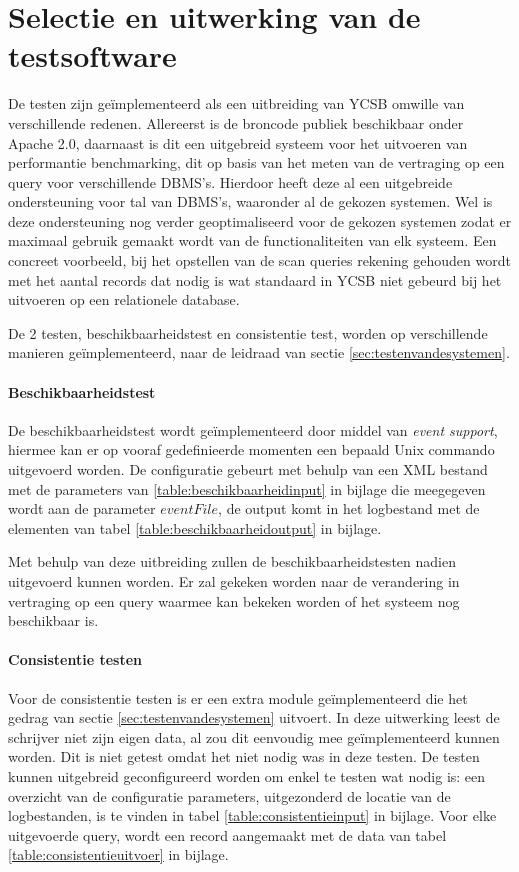 \section{Selectie en uitwerking van de testsoftware}
De testen zijn geïmplementeerd als een uitbreiding van YCSB\cite{cooper2010benchmarking} omwille van verschillende redenen. Allereerst is de broncode publiek beschikbaar onder Apache 2.0, daarnaast is dit een uitgebreid systeem voor het uitvoeren van performantie benchmarking, dit op basis van het meten van de vertraging op een query voor verschillende DBMS's. Hierdoor heeft deze al een uitgebreide ondersteuning voor tal van DBMS's, waaronder al de gekozen systemen. Wel is deze ondersteuning nog verder geoptimaliseerd voor de gekozen systemen zodat er maximaal gebruik gemaakt wordt van de functionaliteiten van elk systeem. Een concreet voorbeeld, bij het opstellen van de scan queries rekening gehouden wordt met het aantal records dat nodig is wat standaard in YCSB niet gebeurd bij het uitvoeren op een relationele database. 

De 2 testen, beschikbaarheidstest en consistentie test, worden op verschillende manieren geïmplementeerd, naar de leidraad van sectie \ref{sec:testenvandesystemen}.  

\paragraph{Beschikbaarheidstest} De beschikbaarheidstest wordt geïmplementeerd door middel van \textit{event support}, hiermee kan er op vooraf gedefinieerde momenten een bepaald Unix commando uitgevoerd worden. De configuratie gebeurt met behulp van een XML bestand met de parameters van \ref{table:beschikbaarheidinput} in bijlage die meegegeven wordt aan de parameter $eventFile$, de output komt in het logbestand met de elementen van tabel \ref{table:beschikbaarheidoutput} in bijlage. 

Met behulp van deze uitbreiding zullen de beschikbaarheidstesten nadien uitgevoerd kunnen worden. Er zal gekeken worden naar de verandering in vertraging op een query waarmee kan bekeken worden of het systeem nog beschikbaar is. 

\paragraph{Consistentie testen} Voor de consistentie testen is er een extra module geïmplementeerd die het gedrag van sectie \ref{sec:testenvandesystemen} uitvoert. In deze uitwerking leest de schrijver niet zijn eigen data, al zou dit eenvoudig mee geïmplementeerd kunnen worden. Dit is niet getest omdat het niet nodig was in deze testen. De testen kunnen uitgebreid geconfigureerd worden om enkel te testen wat nodig is: een overzicht van de configuratie parameters, uitgezonderd de locatie van de logbestanden, is te vinden in tabel \ref{table:consistentieinput} in bijlage. Voor elke uitgevoerde query, wordt een record aangemaakt met de data van tabel \ref{table:consistentieuitvoer} in bijlage. 

